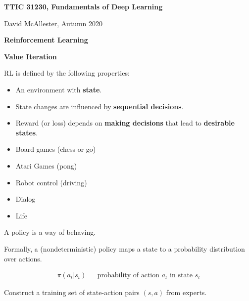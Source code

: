 




{\Huge

  \centerline{\bf TTIC 31230, Fundamentals of Deep Learning}
  \bigskip
  \centerline{David McAllester, Autumn 2020}
\vfill
  \centerline{\bf Reinforcement Learning}
  \vfill
  \centerline{\bf Value Iteration}
  \vfill
\vfill


RL is defined by the following properties:

\vfill
\begin{itemize}
\item An environment with {\bf state}.

  \vfill
\item State changes are influenced by {\bf sequential decisions}.

  \vfill
\item  Reward (or loss) depends on {\bf making decisions} that lead to {\bf desirable states}.
\end{itemize}


\begin{itemize}
\item Board games (chess or go)

  \vfill
\item Atari Games (pong)

  \vfill
\item Robot control (driving)

  \vfill
\item Dialog

  \vfill
\item Life

\end{itemize}


A policy is a way of behaving.

\vfill
Formally, a (nondeterministic) policy maps a state to a probability distribution over actions.

\vfill
\begin{eqnarray*}
    \pi(a_t|s_t) & & \mbox{probability of action $a_t$ in state $s_t$}
\end{eqnarray*}


Construct a training set of state-action pairs $(s,a)$ from experts.

}

